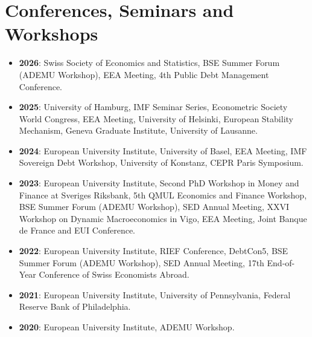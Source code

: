 \documentclass[letterpaper,11pt]{article}
\makeatletter
\newcommand{\resumeItem}[2]{
  \item\small{
    \textbf{#1}{: #2 \vspace{-2pt}}
  }
}
\newcommand{\resumeSubheading}[4]{
  \vspace{-1pt}\item
    \begin{tabular*}{0.97\textwidth}{l@{\extracolsep{\fill}}r}
      \textbf{#1} & #2 \\
      \textit{\small#3} & \textit{\small #4} \\
    \end{tabular*}\vspace{-5pt}
}
\newcommand{\resumeSubItem}[2]{\resumeItem{#1}{#2}\vspace{-1pt}}
\newcommand{\resumeSubHeadingListStart}{\begin{itemize}[leftmargin=*]}
\newcommand{\resumeSubHeadingListEnd}{\end{itemize}}
\makeatother
\begin{document}
%  
%      

\section{Conferences, Seminars and Workshops}
\resumeSubHeadingListStart
\resumeSubItem{2026}{Swiss Society of Economics and Statistics, BSE Summer Forum (ADEMU Workshop), EEA Meeting, 4th Public Debt Management Conference.}
\resumeSubItem{2025}{University of Hamburg, IMF Seminar Series, Econometric Society World Congress, EEA Meeting, University of Helsinki, European Stability Mechanism, Geneva Graduate Institute, University of Lausanne.}
\resumeSubItem{2024}{European University Institute, University of Basel, EEA Meeting, IMF Sovereign Debt Workshop, University of Konstanz, CEPR Paris Symposium.}
\resumeSubItem{2023}{European University Institute, Second PhD Workshop in Money and Finance at Sveriges Riksbank, 5th QMUL Economics and Finance Workshop, BSE Summer Forum (ADEMU Workshop), SED Annual Meeting, XXVI Workshop on Dynamic Macroeconomics in Vigo, EEA Meeting, Joint Banque de France and EUI Conference.}
\resumeSubItem{2022}{European University Institute, RIEF Conference, DebtCon5, BSE Summer Forum (ADEMU Workshop), SED Annual Meeting, 17th End-of-Year Conference of Swiss Economists Abroad.}
\resumeSubItem{2021}{European University Institute, University of Pennsylvania, Federal Reserve Bank of Philadelphia.}
\resumeSubItem{2020}{European University Institute, ADEMU Workshop.}
\resumeSubHeadingListEnd
\end{document}
